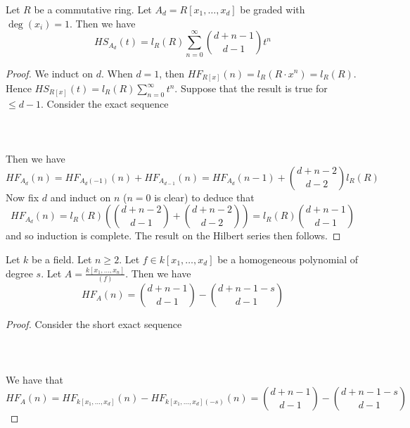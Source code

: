\documentclass[a4paper]{article}
\begin{document}
\begin{eg}{}{} Let $R$ be a commutative ring. Let $A_d=R[x_1,\dots,x_d]$ be graded with $\deg(x_i)=1$. Then we have $$HS_{A_d}(t)=l_R(R)\sum_{n=0}^\infty\binom{d+n-1}{d-1}t^n$$ 
\begin{proof}
We induct on $d$. When $d=1$, then $HF_{R[x]}(n)=l_R(R\cdot x^n)=l_R(R)$. Hence $HS_{R[x]}(t)=l_R(R)\sum_{n=0}^\infty t^n$. Suppose that the result is true for $\leq d-1$. Consider the exact sequence \\~\\
\\~\\
Then we have $$HF_{A_d}(n)=HF_{A_d(-1)}(n)+HF_{A_{d-1}}(n)=HF_{A_d}(n-1)+\binom{d+n-2}{d-2}l_R(R)$$ Now fix $d$ and induct on $n$ ($n=0$ is clear) to deduce that $$HF_{A_d}(n)=l_R(R)\left(\binom{d+n-2}{d-1}+\binom{d+n-2}{d-2}\right)=l_R(R)\binom{d+n-1}{d-1}$$ and so induction is complete. The result on the Hilbert series then follows. 
\end{proof}
\end{eg}

\begin{eg}{}{} Let $k$ be a field. Let $n\geq 2$. Let $f\in k[x_1,\dots,x_d]$ be a homogeneous polynomial of degree $s$. Let $A=\frac{k[x_1,\dots,x_n]}{(f)}$. Then we have $$HF_A(n)=\binom{d+n-1}{d-1}-\binom{d+n-1-s}{d-1}$$ 
\begin{proof}
Consider the short exact sequence \\~\\
\\~\\
We have that $$HF_A(n)=HF_{k[x_1,\dots,x_d]}(n)-HF_{k[x_1,\dots,x_d](-s)}(n)=\binom{d+n-1}{d-1}-\binom{d+n-1-s}{d-1}$$
\end{proof}
\end{eg}
\end{document}

